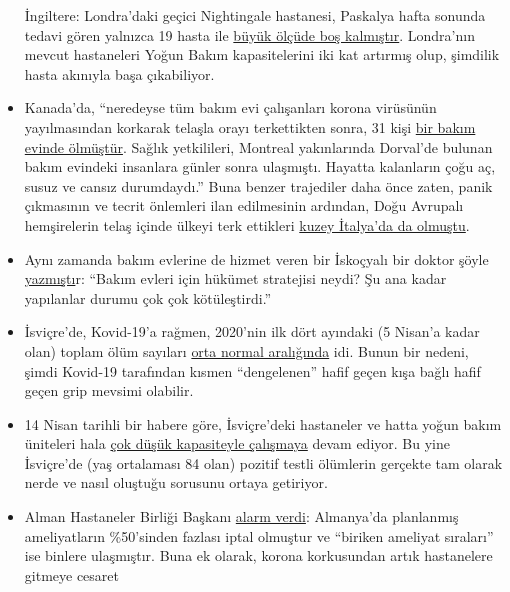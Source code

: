 \begin{itemize}
  İngiltere: Londra'daki geçici Nightingale hastanesi, Paskalya hafta
  sonunda tedavi gören yalnızca 19 hasta ile
  \href{https://www.hsj.co.uk/service-design/exclusive-nightingale-largely-empty-as-icus-handle-surge/7027398.article}{büyük
  ölçüde boş kalmıştır}. Londra'nın mevcut hastaneleri Yoğun Bakım
  kapasitelerini iki kat artırmış olup, şimdilik hasta akınıyla başa
  çıkabiliyor.
\item
  Kanada'da, ``neredeyse tüm bakım evi çalışanları korona virüsünün
  yayılmasından korkarak telaşla orayı terkettikten sonra, 31 kişi
  \href{https://www.nytimes.com/2020/04/16/world/canada/montreal-nursing-homes-coronavirus.html}{bir
  bakım evinde ölmüştür}. Sağlık yetkilileri, Montreal yakınlarında
  Dorval'de bulunan bakım evindeki insanlara günler sonra ulaşmıştı.
  Hayatta kalanların çoğu aç, susuz ve cansız durumdaydı.'' Buna benzer
  trajediler daha önce zaten, panik çıkmasının ve tecrit önlemleri ilan
  edilmesinin ardından, Doğu Avrupalı hemşirelerin telaş içinde ülkeyi
  terk ettikleri
  \href{https://swprs.org/covid-19-a-report-from-italy/}{kuzey İtalya'da
  da olmuştu}.
\item
  Aynı zamanda bakım evlerine de hizmet veren bir İskoçyalı bir doktor
  şöyle
  \href{https://drmalcolmkendrick.org/2020/04/17/care-homes-and-covid19/}{yazmıştı}r:
  ``Bakım evleri için hükümet stratejisi neydi? Şu ana kadar yapılanlar
  durumu çok çok kötüleştirdi.''
\item
  İsviçre'de, Kovid-19'a rağmen, 2020'nin ilk dört ayındaki (5 Nisan'a
  kadar olan) toplam ölüm sayıları
  \href{https://swprs.files.wordpress.com/2020/04/ch-mortalitaet-q1-2020.pdf}{orta
  normal aralığında} idi. Bunun bir nedeni, şimdi Kovid-19 tarafından
  kısmen ``dengelenen'' hafif geçen kışa bağlı hafif geçen grip mevsimi
  olabilir.
\item
  14 Nisan tarihli bir habere göre, İsviçre'deki hastaneler ve hatta
  yoğun bakım üniteleri hala
  \href{https://swprs.files.wordpress.com/2020/04/intensivbettenbelegung-schweiz-2020-04-14.png}{çok
  düşük kapasiteyle çalışmaya} devam ediyor. Bu yine İsviçre'de (yaş
  ortalaması 84 olan) pozitif testli ölümlerin gerçekte tam olarak nerde
  ve nasıl oluştuğu sorusunu ortaya getiriyor.
\item
  Alman Hastaneler Birliği Başkanı
  \href{https://www.bz-berlin.de/deutschland/kliniken-verband-schlaegt-alarm-wegen-corona-regeln}{alarm
  verdi}: Almanya'da planlanmış ameliyatların \%50'sinden fazlası iptal
  olmuştur ve ``biriken ameliyat sıraları'' ise binlere ulaşmıştır. Buna
  ek olarak, korona korkusundan artık hastanelere gitmeye cesaret

\end{itemize}
